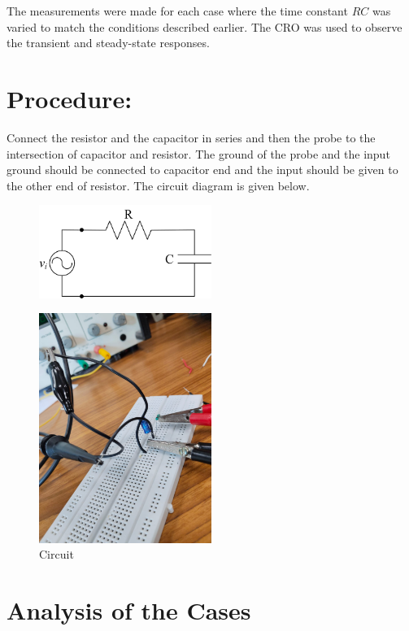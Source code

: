 \documentclass[a4paper,12pt]{article}
\begin{document}
The measurements were made for each case where the time constant \( RC \) was varied to match the conditions described earlier. The CRO was used to observe the transient and steady-state responses.\\
\section{Procedure:}
Connect the resistor and the capacitor in series and then the probe to the intersection of capacitor and resistor. The ground of the probe and the input ground should be connected to capacitor end and the input should be given to the other end of resistor. The circuit diagram is given below.
\begin{figure}[H]
    \centering
    \includegraphics[width=0.5\textwidth]{figs/diagram_cir.png}
\end{figure}

\begin{figure}[H]
    \centering
    \includegraphics[width=0.5\textwidth]{figs/circuit.jpeg}
    \caption{Circuit}
\end{figure}

\section*{Analysis of the Cases}
\end{document}
